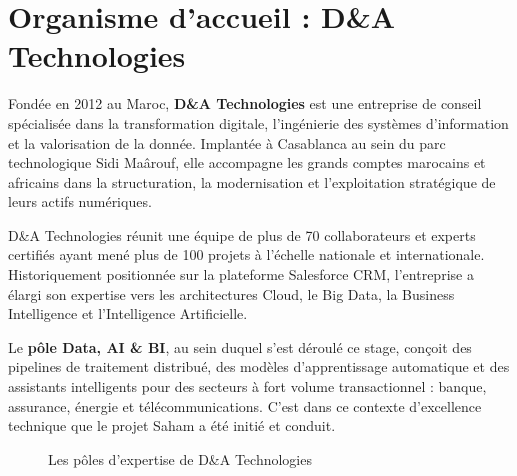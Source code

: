 \documentclass[a4paper,12pt]{report}
\begin{document}
\section{Organisme d'accueil : D\&A Technologies}
\begin{doublespace}
Fondée en 2012 au Maroc, \textbf{D\&A Technologies} est une entreprise de conseil spécialisée dans la transformation digitale, l'ingénierie des systèmes d'information et la valorisation de la donnée. Implantée à Casablanca au sein du parc technologique Sidi Maârouf, elle accompagne les grands comptes marocains et africains dans la structuration, la modernisation et l'exploitation stratégique de leurs actifs numériques.

\noindent D\&A Technologies réunit une équipe de plus de 70 collaborateurs et experts certifiés ayant mené plus de 100 projets à l'échelle nationale et internationale. Historiquement positionnée sur la plateforme Salesforce CRM, l'entreprise a élargi son expertise vers les architectures Cloud, le Big Data, la Business Intelligence et l'Intelligence Artificielle.

\noindent Le \textbf{pôle Data, AI \& BI}, au sein duquel s'est déroulé ce stage, conçoit des pipelines de traitement distribué, des modèles d'apprentissage automatique et des assistants intelligents pour des secteurs à fort volume transactionnel : banque, assurance, énergie et télécommunications. C'est dans ce contexte d'excellence technique que le projet Saham a été initié et conduit.

\begin{figure}[H]
\centering
{}
\caption{Les pôles d'expertise de D\&A Technologies}
\label{fig:da_expertise}
\end{figure}
\end{doublespace}
\end{document}
